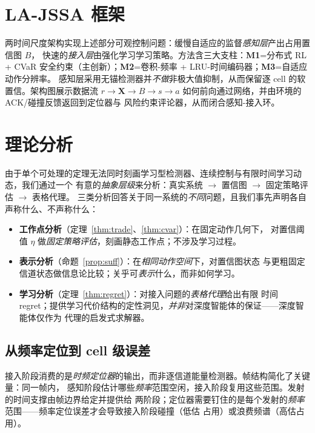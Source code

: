 \documentclass[11pt,a4paper]{article}
\newcommand{\hei}[1]{{\cjkhei #1}}
\theoremstyle{plain}
\theoremstyle{definition}
\newcommand{\thr}{\eta}
\newcommand{\spec}{\mathbf{X}}
\begin{document}
\section{LA-JSSA 框架}
两时间尺度架构实现上述部分可观控制问题：缓慢自适应的监督\emph{感知层}产出占用置信图 $B$，
快速的\emph{接入层}由强化学习学习策略。方法含三大支柱：\textbf{M1}=分布式 RL + CVaR
安全约束（主创新）；\textbf{M2}=卷积-频率 + LRU-时间编码器；\textbf{M3}=自适应动作分辨率。
感知层采用无锚检测器并\emph{不做}非极大值抑制，从而保留逐 cell 的软置信。架构图展示数据流
$r\to\spec\to B\to s\to a$ 如何前向通过网络，并由环境的 ACK/碰撞反馈返回到定位器与
风险约束评论器，从而闭合感知-接入环。

\section{理论分析}
\label{sec:theory}

由于单个可处理的定理无法同时刻画学习型检测器、连续控制与有限时间学习动态，我们通过一个
有意的\emph{抽象层级}来分析：真实系统 $\to$ 置信图 $\to$ 固定策略评估 $\to$ 表格代理。
三类分析回答关于同一系统的\emph{不同}问题，且我们事先声明各自声称什么、不声称什么：
\begin{itemize}[leftmargin=*]
\item \textbf{\hei{工作点分析}}（定理~\ref{thm:trade}、\ref{thm:cvar}）：在固定动作几何下，
对置信阈值 $\thr$ 做\emph{固定策略评估}，刻画静态工作点；不涉及学习过程。
\item \textbf{\hei{表示分析}}（命题~\ref{prop:suff}）：在\emph{相同动作空间}下，对置信图状态
与更粗固定信道状态做信息论比较；关乎可\emph{表示}什么，而非如何学习。
\item \textbf{\hei{学习分析}}（定理~\ref{thm:regret}）：对接入问题的\emph{表格代理}给出有限
时间 regret；提供学习代价结构的定性洞见，\emph{并非}对深度智能体的保证——深度智能体仅作为
代理的启发式求解器。
\end{itemize}

\subsection{从频率定位到 cell 级误差}
接入阶段消费的是\emph{时频定位器}的输出，而非逐信道能量检测器。帧结构简化了关键量：同一帧内，
感知阶段估计哪些\emph{频率}范围空闲，接入阶段复用这些范围。发射的时间支撑由帧边界给定并提供给
两阶段；定位器需要钉住的是每个发射的\emph{频率}范围——频率定位误差才会导致接入阶段碰撞（低估
占用）或浪费频谱（高估占用）。
\end{document}

